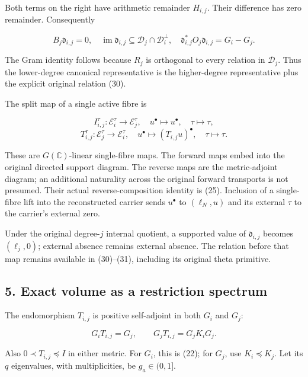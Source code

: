 Both terms on the right have arithmetic remainder \(H_{i,j}\). Their difference has zero remainder. Consequently

\[
 B_j\mathfrak d_{i,j}=0,\quad
 \operatorname{im}\mathfrak d_{i,j}\subseteq
 \mathcal D_j\cap\mathcal D_i^\perp,\quad
 \mathfrak d_{i,j}^*O_j\mathfrak d_{i,j}=G_i-G_j.                  \tag{31}
\]

The Gram identity follows because \(R_j\) is orthogonal to every relation in \(\mathcal D_j\). Thus the lower-degree canonical representative is the higher-degree representative plus the explicit original relation (30).

The split map of a single active fibre is

\[
 I_{i,j}^{\tau}:\mathscr E_i^\tau\to\mathscr E_j^\tau,
 \quad u^\bullet\mapsto u^\bullet,\quad\tau\mapsto\tau,
\] \[
 T_{i,j}^{\tau}:\mathscr E_j^\tau\to\mathscr E_i^\tau,
 \quad u^\bullet\mapsto(T_{i,j}u)^\bullet,\quad\tau\mapsto\tau.    \tag{32}
\]

These are \(G(\mathbb C)\)-linear single-fibre maps. The forward maps embed into the original directed support diagram. The reverse maps are the metric-adjoint diagram; an additional naturality across the original forward transports is not presumed. Their actual reverse-composition identity is (25). Inclusion of a single-fibre lift into the reconstructed carrier sends \(u^\bullet\) to \((\ell_N,u)\) and its external \(\tau\) to the carrier's external zero.

Under the original degree-\(j\) internal quotient, a supported value of \(\mathfrak d_{i,j}\) becomes \((\ell_j,0)\); external absence remains external absence. The relation before that map remains available in (30)--(31), including its original theta primitive.

\subsection{5. Exact volume as a restriction spectrum}\label{endpoint-restriction_original--exact-volume-as-a-restriction-spectrum}

The endomorphism \(T_{i,j}\) is positive self-adjoint in both \(G_i\) and \(G_j\):

\[
 G_iT_{i,j}=G_j,\qquad
 G_jT_{i,j}=G_jK_iG_j.                                           \tag{33}
\]

Also \(0\prec T_{i,j}\preceq I\) in either metric. For \(G_i\), this is (22); for \(G_j\), use \(K_i\preceq K_j\). Let its \(q\) eigenvalues, with multiplicities, be \(g_a\in(0,1]\).

